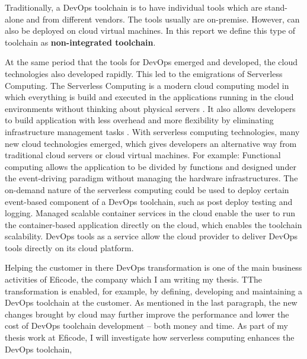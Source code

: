 \par
Traditionally, a DevOps toolchain is to have individual tools which are stand-alone and from different vendors. The tools usually are on-premise. However, can also be deployed on cloud virtual machines. In this report we define this type of toolchain as \textbf{non-integrated toolchain}.
\par
At the same period that the tools for DevOps emerged and developed, the cloud technologies also developed rapidly. This led to the emigrations of Serverless Computing. 
The Serverless Computing is a modern cloud computing model in which everything is build and executed in the applications running in the cloud environments without thinking about physical servers \cite{Serverle81:online}. It also allows developers to build application with less overhead \cite{Serverle81:online} and more flexibility by eliminating infrastructure management tasks \cite{Serverle73:online}.
With serverless computing technologies, many new cloud technologies emerged, which gives developers an alternative way from traditional cloud servers or cloud virtual machines. For example: Functional computing allows the application to be divided by functions and designed under the event-driving paradigm without managing the hardware infrastructures. The on-demand nature of the serverless computing could be used to deploy certain event-based component of a DevOps toolchain, such as post deploy testing and logging.
Managed scalable container services in the cloud enable the user to run the container-based application directly on the cloud, which enables the toolchain scalability. DevOps tools as a service \cite{DevOpsas45:online} allow the cloud provider to deliver DevOps tools directly on its cloud platform.
\par
Helping the customer in there DevOps transformation is one of the main business activities of Eficode, the company which I am writing my thesis. TThe transformation is enabled, for example, by defining, developing and maintaining a DevOps toolchain at the customer. As mentioned in the last paragraph, the new changes brought by cloud may further improve the performance and lower the cost of DevOps toolchain development -- both money and time. As part of my thesis work at Eficode, I will investigate how serverless computing enhances the DevOps toolchain,
